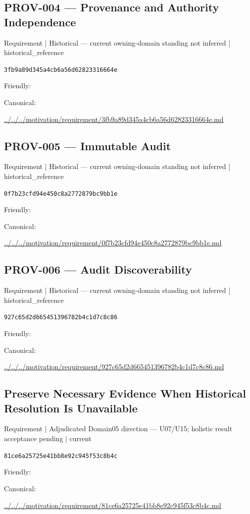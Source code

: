 \documentclass[10pt,a4paper]{article}
\begin{document}
\subsection*{PROV-004 — Provenance and Authority Independence}
{\small Requirement | Historical — current owning-domain standing not inferred | historical\_reference}\par
\texttt{3fb9a89d345a4cb6a56d62823316664e}\par
Friendly: \par
Canonical: \par
{\footnotesize\url{../../../motivation/requirement/3fb9a89d345a4cb6a56d62823316664e.md}}\par
\subsection*{PROV-005 — Immutable Audit}
{\small Requirement | Historical — current owning-domain standing not inferred | historical\_reference}\par
\texttt{0f7b23cfd94e450c8a2772879bc9bb1e}\par
Friendly: \par
Canonical: \par
{\footnotesize\url{../../../motivation/requirement/0f7b23cfd94e450c8a2772879bc9bb1e.md}}\par
\subsection*{PROV-006 — Audit Discoverability}
{\small Requirement | Historical — current owning-domain standing not inferred | historical\_reference}\par
\texttt{927c65d2d665451396782b4c1d7c8c86}\par
Friendly: \par
Canonical: \par
{\footnotesize\url{../../../motivation/requirement/927c65d2d665451396782b4c1d7c8c86.md}}\par
\subsection*{Preserve Necessary Evidence When Historical Resolution Is Unavailable}
{\small Requirement | Adjudicated Domain05 direction — U07/U15; holistic result acceptance pending | current}\par
\texttt{81ce6a25725e41bb8e92c945f53c8b4c}\par
Friendly: \par
Canonical: \par
{\footnotesize\url{../../../motivation/requirement/81ce6a25725e41bb8e92c945f53c8b4c.md}}\par
\end{document}
